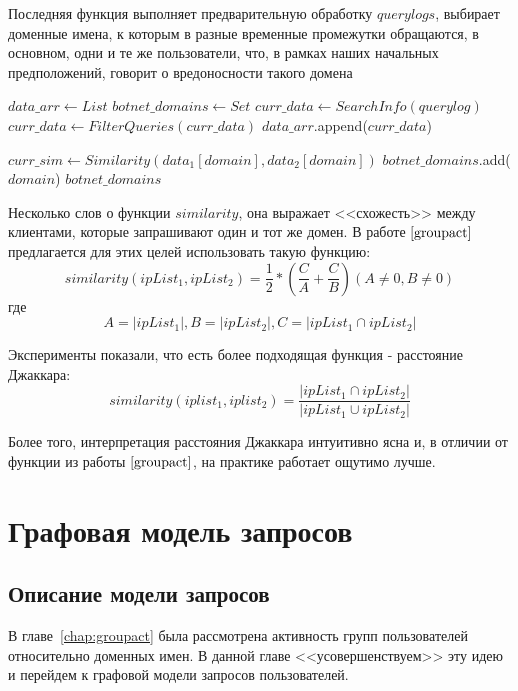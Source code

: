 \documentclass[a4paper,14pt]{extreport} %
\begin{document}
Последняя функция выполняет предварительную обработку $querylogs$, выбирает доменные имена, к которым в разные временные промежутки обращаются, в основном, одни и те же пользователи, что, в рамках наших начальных предположений, говорит о вредоносности такого домена
\begin{algorithmic}
	\State $data\_arr\gets List$
	\State $botnet\_domains\gets Set$
	\State $curr\_data\gets SearchInfo(querylog)$
	\State $curr\_data\gets FilterQueries(curr\_data)$
	\State $data\_arr$.append($curr\_data$)
		
	\EndFor
	\State $curr\_sim\gets Similarity(data_1[domain], data_2[domain])$
	\State $botnet\_domains$.add($domain$)
	\EndIf
	\EndFor
	\EndIf
	\EndFor
	\EndFor
	\State \Return $botnet\_domains$
	\EndFunction
\end{algorithmic}
	
	
Несколько слов о функции $similarity$, она выражает <<схожесть>> между клиентами, которые запрашивают один и тот же домен. В работе $\cite{groupact}$ предлагается для этих целей использовать такую функцию: 
\begin{equation}
	\label{eq:ga-orig}
	similarity(ipList_1, ipList_2) = \frac{1}{2} * (\frac{C}{A} + \frac{C}{B}) (A\ne0, B\ne0)
\end{equation} 
где $$A = |ipList_1|, B = |ipList_2|, C = |ipList_1\cap ipList_2|$$
	
Эксперименты показали, что есть более подходящая функция - расстояние Джаккара: 
\begin{equation}
	\label{eq:ga-jacc}
	similarity(iplist_1, iplist_2) = \frac{|ipList_1\cap ipList_2|}{|ipList_1\cup ipList_2|}
\end{equation} 

Более того, интерпретация расстояния Джаккара интуитивно ясна и, в отличии от функции из работы $\cite{groupact}$, на практике работает ощутимо лучше.
	
\chapter{Графовая модель запросов}
\label{chap:graph}
\section{Описание модели запросов}
В главе~\ref{chap:groupact} была рассмотрена активность групп пользователей относительно доменных имен. В данной главе <<усовершенствуем>> эту идею и перейдем к графовой модели запросов пользователей.
	
\end{document}

